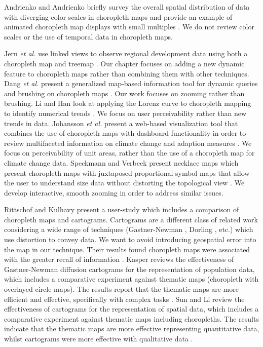 Andrienko and Andrienko briefly survey the overall spatial distribution of data with diverging color scales in choropleth maps and provide an example of animated choropleth map displays with small multiples \cite{andrienko2006exploratory}. We do not review color scales or the use of temporal data in choropleth maps. 

Jern \textit{et al.} use linked views to observe regional development data using both a choropleth map and treemap \cite{jern2009treemaps}. Our chapter focuses on adding a new dynamic feature to choropleth maps rather than combining them with other techniques. Dang \textit{et al.} present a generalized map-based information tool for dynamic queries and brushing on choropleth maps \cite{dang2001dynamic}. Our work focuses on zooming rather than brushing. Li and Han look at applying the Lorenz curve to choropleth mapping to identify numerical trends \cite{li2010discovery}. We focus on user perceivability rather than new trends in data. Johansson \textit{et al.} present a web-based visualization tool that combines the use of choropleth maps with dashboard functionality in order to review multifaceted information on climate change and adaption measures \cite{johansson2017visadapt}. We focus on perceivability of unit areas, rather than the use of a choropleth map for climate change data. Speckmann and Verbeek present necklace maps which present choropleth maps with juxtaposed proportional symbol maps that allow the user to understand size data without distorting the topological view \cite{speckmann2010necklace}. We develop interactive, smooth zooming in order to address similar issues.

Rittschof and Kulhavy present a user-study which includes a comparison of choropleth maps and cartograms. Cartograms are a different class of related work considering a wide range of techniques (Gastner-Newman \cite{gastner2004diffusion}, Dorling \cite{dorling1993computer}, etc.) which use distortion to convey data. We want to avoid introducing geospatial error into the map in our technique. Their results found choropleth maps were associated with the greater recall of information \cite{rittschof1998learning}. Kasper reviews the effectiveness of Gastner-Newman diffusion cartograms \cite{kaspar2011empirical, gastner2004diffusion} for the representation of population data, which includes a comparative experiment against thematic maps (choropleth with overlayed circle maps). The results report that the thematic maps are more efficient and effective, specifically with complex tasks \cite{kaspar2011empirical}.
 Sun and Li review the effectiveness of cartograms for the representation of spatial data, which includes a comparative experiment against thematic maps including choropleths. The results indicate that the thematic maps are more effective representing quantitative data, whilst cartograms were more effective with qualitative data \cite{sun2010effectiveness}.
 
